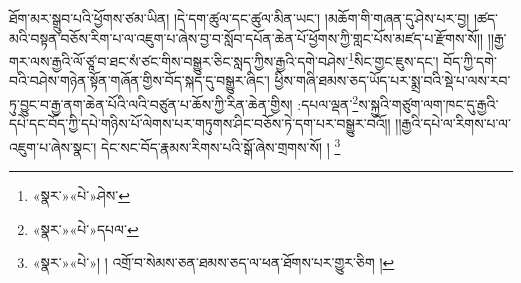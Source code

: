 ཐོག་མར་སྒྲུབ་པའི་ཕྱོགས་ཙམ་ཡིན། །དེ་དག་ཚུལ་དང་ཚུལ་མིན་ཡང་། །མཆོག་གི་གཞན་དུ་ཤེས་པར་བྱ། །ཚད་མའི་བསྟན་བཅོས་རིག་པ་ལ་འཇུག་པ་ཞེས་བྱ་བ་སློབ་དཔོན་ཆེན་པོ་ཕྱོགས་ཀྱི་གླང་པོས་མཛད་པ་རྫོགས་སོ།། །།རྒྱ་གར་ལས་རྒྱའི་ལོ་ཙཱ་བ་ཐང་སཾ་ཙང་གིས་བསྒྱུར་ཅིང་སླད་ཀྱིས་རྒྱའི་དགེ་བཤེས་\footnote{«སྣར་»«པེ་»ཤེས་}སིང་གྱང་ཇུས་དང་། བོད་ཀྱི་དགེ་བའི་བཤེས་གཉེན་སྟོན་གཞོན་གྱིས་བོད་སྐད་དུ་བསྒྱུར་ཞིང་། ཕྱིས་གཞི་ཐམས་ཅད་ཡོད་པར་སྨྲ་བའི་སྡེ་པ་ལས་རབ་ཏུ་བྱུང་བ་རྒྱ་ནག་ཆེན་པོའི་ལའི་བཙུན་པ་ཆོས་ཀྱི་རིན་ཆེན་གྱིས། :དཔལ་ལྡན་\footnote{«སྣར་»«པེ་»དཔལ་}ས་སྐྱའི་གཙུག་ལག་ཁང་དུ་རྒྱའི་དཔེ་དང་བོད་ཀྱི་དཔེ་གཉིས་པོ་ལེགས་པར་གཏུགས་ཤིང་བཅོས་ཏེ་དག་པར་བསྒྱུར་བའོ།། །།རྒྱའི་དཔེ་ལ་རིགས་པ་ལ་འཇུག་པ་ཞེས་སྣང་། དེང་སང་བོད་རྣམས་རིགས་པའི་སྒོ་ཞེས་གྲགས་སོ། ། \footnote{«སྣར་»«པེ་»། ། འགྲོ་བ་སེམས་ཅན་ཐམས་ཅད་ལ་ཕན་ཐོགས་པར་གྱུར་ཅིག །}